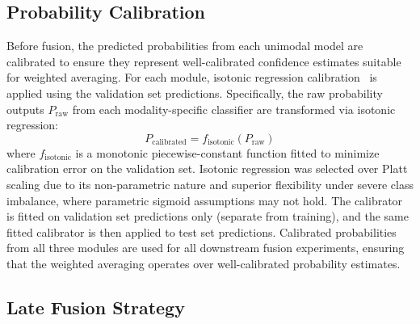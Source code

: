 \documentclass[10pt,letterpaper]{article}
\begin{document}
                                                                                                                  \subsection*{Probability Calibration}

                                                                                                                  Before fusion, the predicted probabilities from each unimodal model are calibrated to ensure they represent well-calibrated confidence estimates suitable for weighted averaging. For each module, isotonic regression calibration~\cite{ref48} is applied using the validation set predictions. Specifically, the raw probability outputs $P_{\text{raw}}$ from each modality-specific classifier are transformed via isotonic regression:
                                                                                                                  \begin{equation}
                                                                                                                  P_{\text{calibrated}} = f_{\text{isotonic}}(P_{\text{raw}})
                                                                                                                  \end{equation}
                                                                                                                  where $f_{\text{isotonic}}$ is a monotonic piecewise-constant function fitted to minimize calibration error on the validation set. Isotonic regression was selected over Platt scaling due to its non-parametric nature and superior flexibility under severe class imbalance, where parametric sigmoid assumptions may not hold. The calibrator is fitted on validation set predictions only (separate from training), and the same fitted calibrator is then applied to test set predictions. Calibrated probabilities from all three modules are used for all downstream fusion experiments, ensuring that the weighted averaging operates over well-calibrated probability estimates.

                                                                                                                  \subsection*{Late Fusion Strategy}
\end{document}
